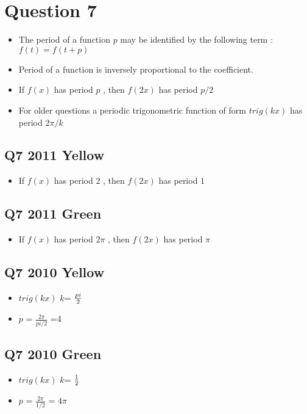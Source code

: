 \documentclass[11pt,a4paper,titlepage,oneside,openany]{article}
\numberwithin{equation}{section}
\numberwithin{algorithm}{section}
\numberwithin{figure}{section}
\numberwithin{table}{section}
\begin{document}
\section*{Question 7}

\begin{itemize}
\item The period of a function $p$ may be identified by the following term : $f(t) = f(t+p)$
\item Period of a function is inversely proportional to the coefficient.
\item If $f(x)$ has period $p$ , then $f(2x)$ has period $p/2$
\item For older questions a periodic trigonometric function of form $trig(kx)$ has period $2\pi/k$
\end{itemize}
\subsection*{Q7 2011 Yellow}
\begin{itemize}
\item If $f(x)$ has period $2$ , then $f(2x)$ has period $1$
\end{itemize}
\subsection*{Q7 2011 Green}
\begin{itemize}
\item If $f(x)$ has period $2\pi$ , then $f(2x)$ has period $\pi$
\end{itemize}
\subsection*{Q7 2010 Yellow}
\begin{itemize}
\item  $trig(kx)$ $k$= ${pi\over 2}$
\item  $p$ = $\frac{2\pi}{pi / 2}$ =4
\end{itemize}
\subsection*{Q7 2010 Green}
\begin{itemize}
\item  $trig(kx)$ $k$= ${1\over2}$
\item  $p$ = $\frac{2\pi}{1/2}$ = $4\pi$
\end{itemize}
\newpage
\end{document}
